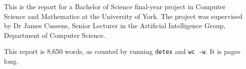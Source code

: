 \documentclass[draft]{scrartcl}
\title{\papertitle}
\author{\paperauthor}
\date{\today}
\begin{document}
\ifpdf
{}
\else
{}
\fi

\maketitle

This is the report for a Bachelor of Science final-year project in Computer
Science and Mathematics at the University of York. The project was supervised
by Dr James Cussens, Senior Lecturer in the Artificial Intelligence Group,
Department of Computer Science.

This report is 8,650 words, as counted by running \texttt{detex} and
\texttt{wc -w}. It is \pageref{LastPage} pages long.



\clearpage
\end{document}
